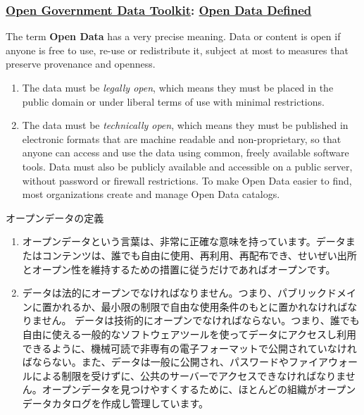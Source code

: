 \documentclass[
]{bxjsbook}
\providecommand{\tightlist}{%
  \setlength{\itemsep}{0pt}\setlength{\parskip}{0pt}}
\theoremstyle{definition}
\theoremstyle{definition}
\theoremstyle{definition}
\theoremstyle{definition}
\theoremstyle{remark}
\begin{document}
\hypertarget{open-government-data-toolkit-open-data-defined}{%
\subsubsection{\texorpdfstring{\href{http://opendatatoolkit.worldbank.org}{Open Government Data Toolkit}: \href{http://opendatatoolkit.worldbank.org/en/essentials.html}{Open Data Defined}}{Open Government Data Toolkit: Open Data Defined}}\label{open-government-data-toolkit-open-data-defined}}

The term \textbf{Open Data} has a very precise meaning. Data or content is open if anyone is free to use, re-use or redistribute it, subject at most to measures that preserve provenance and openness.

\begin{enumerate}
\def\labelenumi{\arabic{enumi}.}
\tightlist
\item
  The data must be \emph{legally open}, which means they must be placed in the public domain or under liberal terms of use with minimal restrictions.
\item
  The data must be \emph{technically open}, which means they must be published in electronic formats that are machine readable and non-proprietary, so that anyone can access and use the data using common, freely available software tools. Data must also be publicly available and accessible on a public server, without password or firewall restrictions. To make Open Data easier to find, most organizations create and manage Open Data catalogs.
\end{enumerate}

オープンデータの定義

\begin{enumerate}
\def\labelenumi{\arabic{enumi}.}
\item
  オープンデータという言葉は、非常に正確な意味を持っています。データまたはコンテンツは、誰でも自由に使用、再利用、再配布でき、せいぜい出所とオープン性を維持するための措置に従うだけであればオープンです。
\item
  データは法的にオープンでなければなりません。つまり、パブリックドメインに置かれるか、最小限の制限で自由な使用条件のもとに置かれなければなりません。
  データは技術的にオープンでなければならない。つまり、誰でも自由に使える一般的なソフトウェアツールを使ってデータにアクセスし利用できるように、機械可読で非専有の電子フォーマットで公開されていなければならない。また、データは一般に公開され、パスワードやファイアウォールによる制限を受けずに、公共のサーバーでアクセスできなければなりません。オープンデータを見つけやすくするために、ほとんどの組織がオープンデータカタログを作成し管理しています。
\end{enumerate}
\end{document}
